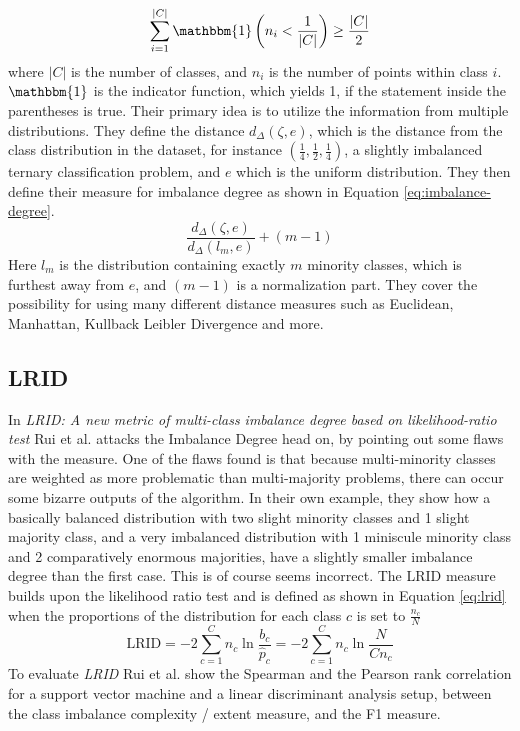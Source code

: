 \begin{equation}
    \label{eq:multi-minority}
\sum_{i=1}^{|C|}\mathbbm{1} \left (n_{i} < \frac{1}{|C|} \right )\geq\frac{|C|}{2}
\end{equation}
where $|C|$ is the number of classes, and $n_i$ is the number of points within class $i$. $\mathbbm{1}$ is the indicator function, which yields 1, if the statement inside the parentheses is true. Their primary idea is to utilize the information from multiple distributions. They define the distance $d_\Delta(\zeta,e)$, which is the distance from the class distribution in the dataset, for instance $\left (\frac{1}{4},\frac{1}{2},\frac{1}{4} \right )$, a slightly imbalanced ternary classification problem, and $e$ which is the uniform distribution. They then define their measure for imbalance degree as shown in Equation \ref{eq:imbalance-degree}.
\begin{equation}
    \label{eq:imbalance-degree}
    \frac{d_\Delta(\zeta,e)}{d_\Delta(l_m,e)} + (m-1)
\end{equation}
Here $l_m$ is the distribution containing exactly $m$ minority classes, which is furthest away from $e$, and $(m-1)$ is a normalization part. They cover the possibility for using many different distance measures such as Euclidean, Manhattan, Kullback Leibler Divergence and more. 

\subsection*{LRID}
In \emph{LRID: A new metric of multi-class imbalance degree based on
likelihood-ratio test} \cite{DBLP:journals/prl/ZhuWMWX18} Rui et al. attacks the Imbalance Degree head on, by pointing out some flaws with the measure. One of the flaws found is that because multi-minority classes are weighted as more problematic than multi-majority problems, there can occur some bizarre outputs of the algorithm. In their own example, they show how a basically balanced distribution with two slight minority classes and 1 slight majority class, and a very imbalanced distribution with 1 miniscule minority class and 2 comparatively enormous majorities, have a slightly smaller imbalance degree than the first case. This is of course seems incorrect.
The LRID measure builds upon the likelihood ratio test and is defined as shown in Equation \ref{eq:lrid} when the proportions of the distribution for each class $c$ is set to $\frac{n_c}{N}$
\begin{equation}
    \label{eq:lrid}
    \text{LRID}=-2\sum_{c=1}^{C}n_{c}\ln\frac{b_c}{\hat{p}_c}=-2\sum_{c=1}^{C}n_{c}\ln\frac{N}{Cn_c}
\end{equation} 
To evaluate \emph{LRID} Rui et al. show the Spearman and the Pearson rank correlation for a support vector machine and a linear discriminant analysis setup, between the class imbalance complexity / extent measure, and the F1 measure.   

